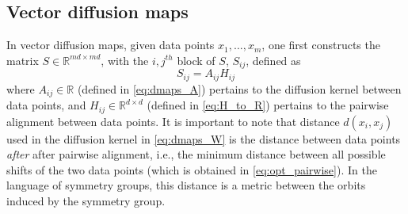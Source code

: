 \documentclass{pnastwo}
\begin{document}
\begin{article}
\begin{materials}
\section{Vector diffusion maps\cite{singer2012vector}}

In vector diffusion maps, given data points $x_1, \dots, x_m$, one first constructs the matrix $S \in \mathbb{R}^{md \times md}$, with the $i,j^{th}$ block of $S$, $S_{ij}$, defined as
\begin{equation} \label{eq:vdm_S}
	S_{ij} = A_{ij} H_{ij}
\end{equation}
%
where $A_{ij} \in \mathbb{R}$ (defined in \eqref{eq:dmaps_A}) pertains to the diffusion kernel between data points, and $H_{ij} \in \mathbb{R}^{d \times d}$ (defined in \eqref{eq:H_to_R}) pertains to the pairwise alignment between data points.
%
It is important to note that distance $d(x_i, x_j)$ used in the diffusion kernel in \eqref{eq:dmaps_W} is the distance between data points {\it after} after pairwise alignment, i.e., the minimum distance between all possible shifts of the two data points (which is obtained in \eqref{eq:opt_pairwise}).
%
In the language of symmetry groups, this distance is a metric between the orbits induced by the symmetry group.


\end{materials}
\end{article}
\end{document}

